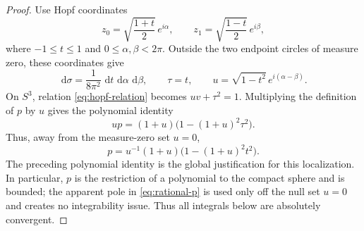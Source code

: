\documentclass[11pt]{article}
\numberwithin{equation}{section}
\newcommand{\dd}{\,\mathrm d}
\begin{document}
\begin{proof}
Use Hopf coordinates
\begin{equation}\label{eq:hopf-parametrization}
 z_0=\sqrt{\frac{1+t}{2}}\,e^{i\alpha},
 \qquad
 z_1=\sqrt{\frac{1-t}{2}}\,e^{i\beta},
\end{equation}
where $-1\leq t\leq1$ and $0\leq\alpha,\beta<2\pi$.  Outside the two endpoint
circles of measure zero, these coordinates give
\begin{equation}\label{eq:s3-measure}
 \dd\sigma=\frac{1}{8\pi^2}\,\dd t\,\dd\alpha\,\dd\beta,
 \qquad
 \tau=t,
 \qquad
 u=\sqrt{1-t^2}\,e^{i(\alpha-\beta)}.
\end{equation}
On $S^3$, relation \eqref{eq:hopf-relation} becomes $uv+\tau^2=1$.
Multiplying the definition of $p$ by $u$ gives the polynomial identity
\begin{equation}\label{eq:no-division-identity}
 up=(1+u)\bigl(1-(1+u)^2\tau^2\bigr).
\end{equation}
Thus, away from the measure-zero set $u=0$,
\begin{equation}\label{eq:rational-p}
 p=u^{-1}(1+u)\bigl(1-(1+u)^2t^2\bigr).
\end{equation}
The preceding polynomial identity is the global justification for this
localization.  In particular, $p$ is the restriction of a polynomial to the
compact sphere and is bounded; the apparent pole in \eqref{eq:rational-p} is
used only off the null set $u=0$ and creates no integrability issue.  Thus all
integrals below are absolutely convergent.


\end{proof}
\end{document}
